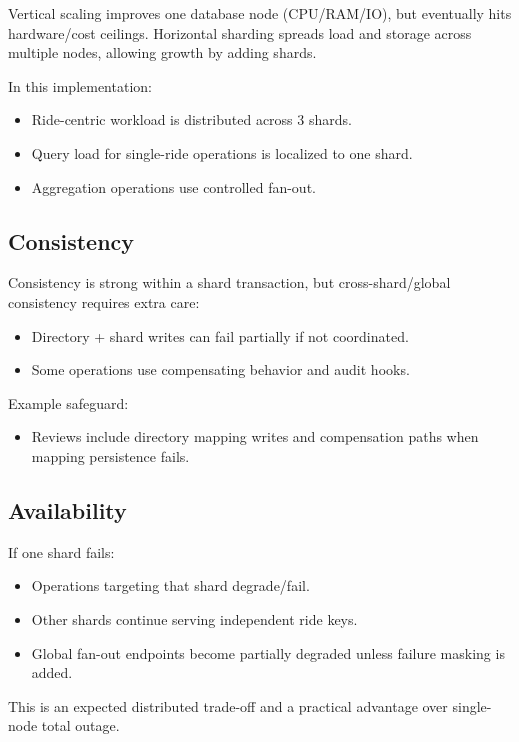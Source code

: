 \documentclass[12pt]{article}
\begin{document}
Vertical scaling improves one database node (CPU/RAM/IO), but eventually hits hardware/cost ceilings.
Horizontal sharding spreads load and storage across multiple nodes, allowing growth by adding shards.

In this implementation:
\begin{itemize}
    \item Ride-centric workload is distributed across 3 shards.
    \item Query load for single-ride operations is localized to one shard.
    \item Aggregation operations use controlled fan-out.
\end{itemize}

\subsection{Consistency}

Consistency is strong within a shard transaction, but cross-shard/global consistency requires extra care:
\begin{itemize}
    \item Directory + shard writes can fail partially if not coordinated.
    \item Some operations use compensating behavior and audit hooks.
\end{itemize}

Example safeguard:
\begin{itemize}
    \item Reviews include directory mapping writes and compensation paths when mapping persistence fails.
\end{itemize}

\subsection{Availability}

If one shard fails:
\begin{itemize}
    \item Operations targeting that shard degrade/fail.
    \item Other shards continue serving independent ride keys.
    \item Global fan-out endpoints become partially degraded unless failure masking is added.
\end{itemize}

This is an expected distributed trade-off and a practical advantage over single-node total outage.
\end{document}
